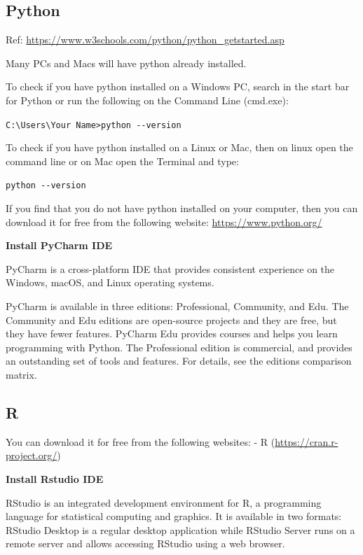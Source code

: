 \documentclass[]{book}
\begin{document}
\hypertarget{python-3}{%
\subsection{Python}\label{python-3}}

Ref: \url{https://www.w3schools.com/python/python_getstarted.asp}

Many PCs and Macs will have python already installed.

To check if you have python installed on a Windows PC, search in the start bar for Python or run the following on the Command Line (cmd.exe):

\texttt{C:\textbackslash{}Users\textbackslash{}Your\ Name\textgreater{}python\ -\/-version}

To check if you have python installed on a Linux or Mac, then on linux open the command line or on Mac open the Terminal and type:

\texttt{python\ -\/-version}

If you find that you do not have python installed on your computer, then you can download it for free from the following website: \url{https://www.python.org/}

\textbf{Install PyCharm IDE}

PyCharm is a cross-platform IDE that provides consistent experience on the Windows, macOS, and Linux operating systems.

PyCharm is available in three editions: Professional, Community, and Edu. The Community and Edu editions are open-source projects and they are free, but they have fewer features. PyCharm Edu provides courses and helps you learn programming with Python. The Professional edition is commercial, and provides an outstanding set of tools and features. For details, see the editions comparison matrix.

\hypertarget{r-3}{%
\subsection{R}\label{r-3}}

You can download it for free from the following websites:
- R (\url{https://cran.r-project.org/})

\textbf{Install Rstudio IDE}

RStudio is an integrated development environment for R, a programming language for statistical computing and graphics. It is available in two formats: RStudio Desktop is a regular desktop application while RStudio Server runs on a remote server and allows accessing RStudio using a web browser.
\end{document}
